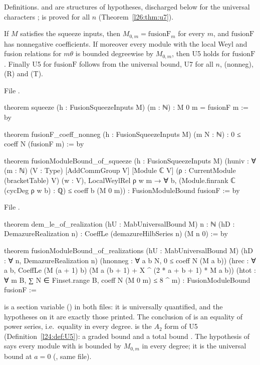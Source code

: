 \begin{status}
Definitions.  and  are structures of hypotheses, discharged below for
the universal characters ;  is proved for all $n$ (Theorem~\ref{l26:thm:u7}).
\end{status}

\begin{theorem}\label{l26:thm:squeeze}
If $M$ satisfies the squeeze inputs, then $M_{0,m}=\mathrm{fusionF}_m$ for every $m$, and $\mathrm{fusionF}$ has nonnegative
coefficients. If moreover every module with the local Weyl and fusion relations for $m\theta$ is bounded degreewise by
$M_{0,m}$, then U5 holds for $\mathrm{fusionF}$. Finally U5 for $\mathrm{fusionF}$ follows from the universal bound, U7 for
all $n$, (nonneg), (R) and (T).
\end{theorem}
\noindent File .
\begin{leancode}
theorem squeeze (h : FusionSqueezeInputs M) (m : ℕ) : M 0 m = fusionF m := by

theorem fusionF_coeff_nonneg (h : FusionSqueezeInputs M) (m N : ℕ) :
    0 ≤ coeff N (fusionF m) := by

theorem fusionModuleBound_of_squeeze (h : FusionSqueezeInputs M)
    (huniv : ∀ (m : ℕ) (V : Type) [AddCommGroup V] [Module ℂ V]
      (ρ : CurrentModule (bracketTable) V) (w : V), LocalWeylRel ρ w m →
        ∀ b, (Module.finrank ℂ (cycDeg ρ w b) : ℚ) ≤ coeff b (M 0 m)) :
    FusionModuleBound fusionF := by
\end{leancode}
\noindent File .
\begin{leancode}
theorem dem_le_of_realization (hU : MabUniversalBound M) {n : ℕ} (hD : DemazureRealization n) :
    CoeffLe (demazureHilbSeries n) (M n 0) := by

theorem fusionModuleBound_of_realizations (hU : MabUniversalBound M)
    (hD : ∀ n, DemazureRealization n) (hnonneg : ∀ a b N, 0 ≤ coeff N (M a b))
    (hrec : ∀ a b, CoeffLe (M (a + 1) b) (M a (b + 1) + X ^ (2 * a + b + 1) * M a b))
    (htot : ∀ m B, ∑ N ∈ Finset.range B, coeff N (M 0 m) ≤ 8 ^ m) :
    FusionModuleBound fusionF :=
\end{leancode}

\begin{dictionary}
 is a section variable () in both files: it is universally
quantified, and the hypotheses on it are exactly those printed. The conclusion of  is an equality of
power series, i.e.\ equality in every degree.  is the $A_2$ form of U5
(Definition~\ref{l24:def:U5}): a graded bound  and a total bound . The hypothesis  of
 says every module with  is bounded by $M_{0,m}$ in every
degree; it is the universal bound at $a=0$ (, same file).
\end{dictionary}

